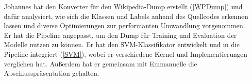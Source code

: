 Johannes hat den Konverter für den Wikipedia-Dump erstellt (\ref{WPDump}) und dafür analysiert, wie sich die Klassen und Labels anhand des Quellcodes erkennen lassen und diverse Optimierungen zur performanten Umwandlung vorgenommen. Er hat die Pipeline angepasst, um den Dump für Training und Evaluation der Modelle nutzen zu können. Er hat den SVM-Klassifikator entwickelt und in die Pipeline integriert (\ref{SVM}), wobei er verschiedene Kernel und Implementierungen verglichen hat. Außerdem hat er gemeinsam mit Emmanuelle die Abschlusspräsentation gehalten.
